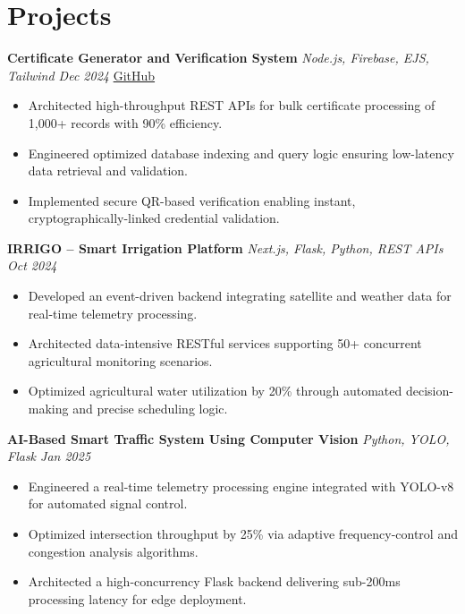 \documentclass[a4paper,10pt]{article}
\begin{document}
\section*{Projects}

\textbf{Certificate Generator and Verification System} \hfill \textit{Node.js, Firebase, EJS, Tailwind \quad Dec 2024} \quad \href{https://github.com/your-github/advanced-certificate-generator}{GitHub}
\begin{itemize}
\item Architected high-throughput REST APIs for bulk certificate processing of 1,000+ records with 90\% efficiency.
\item Engineered optimized database indexing and query logic ensuring low-latency data retrieval and validation.
\item Implemented secure QR-based verification enabling instant, cryptographically-linked credential validation.
\end{itemize}

\vspace{2pt}

\textbf{IRRIGO -- Smart Irrigation Platform} \hfill \textit{Next.js, Flask, Python, REST APIs \quad Oct 2024}
\begin{itemize}
\item Developed an event-driven backend integrating satellite and weather data for real-time telemetry processing.
\item Architected data-intensive RESTful services supporting 50+ concurrent agricultural monitoring scenarios.
\item Optimized agricultural water utilization by 20\% through automated decision-making and precise scheduling logic.
\end{itemize}

\vspace{2pt}

\textbf{AI-Based Smart Traffic System Using Computer Vision} \hfill \textit{Python, YOLO, Flask \quad Jan 2025}
\begin{itemize}
\item Engineered a real-time telemetry processing engine integrated with YOLO-v8 for automated signal control.
\item Optimized intersection throughput by 25\% via adaptive frequency-control and congestion analysis algorithms.
\item Architected a high-concurrency Flask backend delivering sub-200ms processing latency for edge deployment.
\end{itemize}
\end{document}
